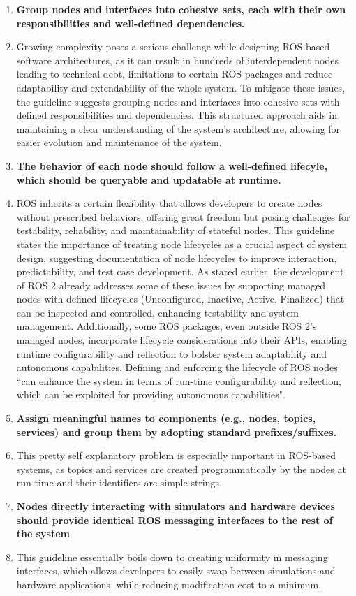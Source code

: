 \documentclass[%
paper=A4,               %
twoside=true,           %
openright,              %
11pt,                   %
bibliography=totoc,     %
titlepage=on,           %
DIV=12,                 %
BCOR=1.5cm,             %
parskip=half,            %
final
]{scrreprt}
\begin{document}
\begin{enumerate}[leftmargin=9mm, align=left]
		\item \textbf{Group nodes and interfaces into cohesive sets, each with their own responsibilities and well-defined dependencies.} 
		\item[]Growing complexity poses a serious challenge while designing ROS-based software architectures, as it can result in hundreds of interdependent nodes leading to technical debt, limitations to certain ROS packages and reduce adaptability and extendability of the whole system. To mitigate these issues, the guideline suggests grouping nodes and interfaces into cohesive sets with defined responsibilities and dependencies. This structured approach aids in maintaining a clear understanding of the system's architecture, allowing for easier evolution and maintenance of the system. \autocite{malavoltaHowYouArchitect2020}
		\item \textbf{The behavior of each node should follow a well-defined lifecyle, which should be queryable and updatable at runtime.} 
		\item[]ROS inherits a certain flexibility that allows developers to create nodes without prescribed behaviors, offering great freedom but posing challenges for testability, reliability, and maintainability of stateful nodes. This guideline states the importance of treating node lifecycles as a crucial aspect of system design, suggesting documentation of node lifecycles to improve interaction, predictability, and test case development. As stated earlier, the development of ROS 2 already addresses some of these issues by supporting managed nodes with defined lifecycles (Unconfigured, Inactive, Active, Finalized) that can be inspected and controlled, enhancing testability and system management. Additionally, some ROS packages, even outside ROS 2's managed nodes, incorporate lifecycle considerations into their APIs, enabling runtime configurability and reflection to bolster system adaptability and autonomous capabilities. \autocite{malavoltaHowYouArchitect2020}  Defining and enforcing the lifecycle of ROS nodes ``can enhance the system in terms of run-time configurability and reflection, which can be exploited for providing autonomous capabilities". \autocite{malavoltaHowYouArchitect2020}
		\item  \textbf{Assign meaningful names to components (e.g., nodes, topics, services) and group them by adopting standard prefixes/suffixes.} 
		\item[] This pretty self explanatory problem is especially important in ROS-based systems, as topics and services are created programmatically by the nodes at run-time and their identifiers are simple strings. \autocite{malavoltaHowYouArchitect2020}
		\item  \textbf{Nodes directly interacting with simulators and hardware devices should provide identical ROS messaging interfaces to the rest of the system} 
		\item[] This guideline essentially boils down to creating uniformity in messaging interfaces, which allows developers to easily swap between simulations and hardware applications, while reducing modification cost to a minimum. \autocite{malavoltaHowYouArchitect2020}
		

\end{enumerate}
\end{document}
